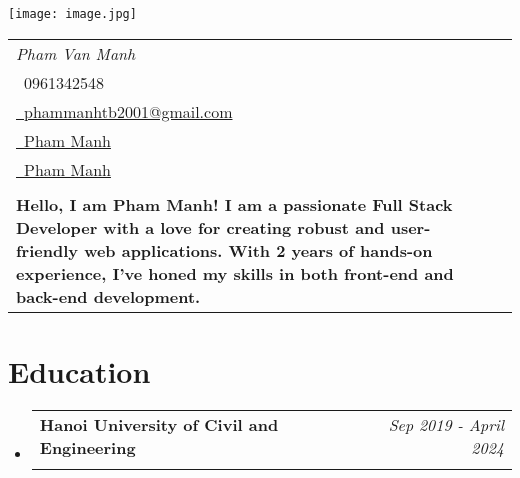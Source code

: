 \documentclass[a4paper,11pt]{article}
\makeatletter
\newcommand{\resumeSubheading}[4]{
\vspace{0.5mm}\item
    \begin{tabular*}{0.98\textwidth}[t]{l@{\extracolsep{\fill}}r}
        \textbf{#1} & \textit{\footnotesize{#4}} \\
        \textit{\footnotesize{#3}} &  \footnotesize{#2}\\
    \end{tabular*}
    \vspace{-2.4mm}
}
\newcommand{\resumeSubHeadingListStart}{\begin{itemize}[leftmargin=*,labelsep=0mm]}
\newcommand{\resumeSubHeadingListEnd}{\end{itemize}\vspace{2mm}}
\newcommand{\name}{Pham Van Manh} %
\newcommand{\phone}{0961342548} %
\newcommand{\emaila}{phammanhtb2001@gmail.com} %
\newcommand{\headline}{Hello, I am Pham Manh! I am a passionate Full Stack Developer with a love for creating robust and user-friendly web applications. With 2 years of hands-on experience, I’ve honed my skills in both front-end and back-end development.}
\makeatother
\begin{document}
\selectfont


\parbox{2.6cm}{%
\texttt{[image: image.jpg]}
}
\parbox{\dimexpr\linewidth-2.9cm\relax}{
\begin{tabularx}{\linewidth}{L r} \\
  \textit{\Large \name} \\ {\raisebox{0.0\height}{\footnotesize \faPhone}\ \phone}\\
\href{mailto:\emaila}{\raisebox{0.0\height}{\footnotesize \faEnvelope}\ {\emaila}} \\
 \href{https://github.com/manhpvxj}{\raisebox{0.0\height}{\footnotesize \faGithub}\ {Pham Manh}} \\
  \href{https://www.linkedin.com/in/manhpvxj/}{\raisebox{0.0\height}{\footnotesize \faLinkedin}\ {Pham Manh}} \\ \\
  \textbf{\headline}
\end{tabularx}
}





\section{\textbf{Education}}
  \resumeSubHeadingListStart
    \resumeSubheading
      {Hanoi University of Civil and Engineering}{}
      {}{Sep 2019 - April 2024}
  \resumeSubHeadingListEnd
%



\end{document}
